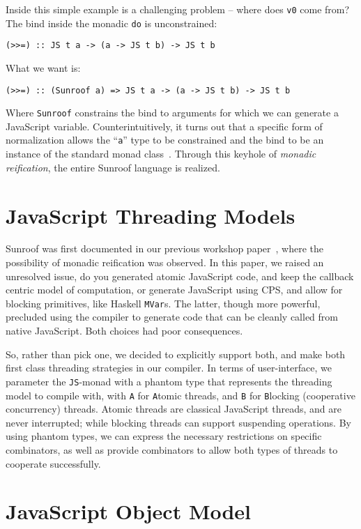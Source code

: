\documentclass{llncs}
\newcommand{\Src}[1]{{\tt{#1}}}
\newcommand{\JS}{\Src{JS}}
\begin{document}
Inside this simple example is a challenging problem -- where does
\Src{v0} come from? The bind inside the monadic \Src{do} is
unconstrained:
\begin{verbatim}
(>>=) :: JS t a -> (a -> JS t b) -> JS t b
\end{verbatim}
What we want is:
\begin{verbatim}
(>>=) :: (Sunroof a) => JS t a -> (a -> JS t b) -> JS t b
\end{verbatim}
Where \Src{Sunroof} constrains the bind to
arguments for which we can generate a JavaScript variable.
Counterintuitively, 
it turns out that a specific form of normalization allows 
the ``\Src{a}'' type to be constrained and the bind to 
be an instance of the standard monad class~\cite{Sculthorpe:13:ConstrainedMonads}.
Through this keyhole of {\em monadic reification\/},
the entire Sunroof language is realized.

\section{JavaScript Threading Models}

Sunroof was first documented in our previous 
workshop paper~\cite{Farmer:12:WebDSLs},
where the possibility of monadic reification was observed.
In this paper, we raised an unresolved issue, do you
generated atomic JavaScript code, and keep the callback
centric model of computation, or generate JavaScript
using CPS, and allow for blocking primitives,
like Haskell \Src{MVar}s. The latter, though more powerful, 
precluded using the compiler to generate
code that can be cleanly called from native JavaScript.
Both choices had poor consequences.

So, rather than pick one, we decided to explicitly support both,
and make both first class threading strategies in our compiler.
In terms of user-interface, we parameter the \JS-monad
with a phantom type that represents the threading model
to compile with, with \Src{A} for \Src{A}tomic threads,
and \Src{B} for \Src{B}locking (cooperative concurrency) threads. 
Atomic threads are classical JavaScript threads, and
are never interrupted; while blocking threads can
support suspending operations. By using phantom
types, we can express the necessary
restrictions on specific combinators, as well
as provide combinators to allow both types of
threads to cooperate successfully.

\section{JavaScript Object Model}
\end{document}
